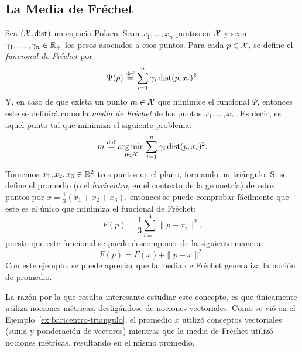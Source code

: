 {{		\subsection*{La Media de Fréchet}\label{ssec:la-media-de-Frechet}
		{
			\begin{definition}
				Sea $(\mathcal{X}, \operatorname{dist})$ un espacio Polaco. Sean $x_1, \ldots, x_n$ puntos en $\mathcal{X}$ y sean $\gamma_1,\ldots,\gamma_n\in\mathbb{R}_+$ los pesos asociados a esos puntos. Para cada $p\in\mathcal{X}$, se define el \emph{funcional de Fréchet} por
				\begin{equation}
					\label{eq:funcionalFrechet}
					\Psi(p) \stackrel{\mathrm{def}}{=} \sum_{i=1}^{n} \gamma_i \operatorname{dist}(p, x_i)^2.
				\end{equation}
				Y, en caso de que exista un punto $m \in \mathcal{X}$ que minimice el funcional $\Psi$, entonces este se definirá como la \emph{media de Fréchet} de los puntos $x_1,\ldots, x_n$. Es decir, es aquel punto tal que minimiza el siguiente problema:
				\begin{equation}
					\label{eq:mediaFrechet}
					m \stackrel{\mathrm{def}}{=} \operatorname*{arg\,m{i}n}_{p \in \mathcal{X}} \sum_{i=1}^{n} \gamma_i \operatorname{dist}(p, x_i)^2.
				\end{equation}
			\end{definition}

			\begin{example}\label{ex:baricentro-triangulo}
				Tomemos $x_1, x_2, x_3 \in \mathbb{R}^2$ tres puntos en el plano, formando un triángulo. Si se define el promedio (o el \textit{baricentro}, en el contexto de la geometría) de estos puntos por $\bar x = \frac{1}{3} (x_1 + x_2 + x_3)$, entonces se puede comprobar fácilmente que este es el único que minimiza el funcional de Fréchet:
				\begin{equation}
					F(p) = \frac{1}{3} \sum_{i=1}^{3} \|p - x_i\|^2,
				\end{equation}
				puesto que este funcional se puede descomponer de la siguiente manera:
				\begin{equation}
					F(p) = F(\bar x) + \|p-\bar x\|^2.
				\end{equation}
				Con este ejemplo, se puede apreciar que la media de Fréchet generaliza la noción de promedio.
			\end{example}

			\begin{remark}
				La razón por la que resulta interesante estudiar este concepto, es que únicamente utiliza nociones métricas, desligándose de nociones vectoriales. Como se vió en el Ejemplo~\ref{ex:baricentro-triangulo}, el promedio $\bar x$ utilizó conceptos vectoriales (suma y ponderación de vectores) mientras que la media de Fréchet utilizó nociones métricas, resultando en el mismo promedio.


\end{remark}}}}
